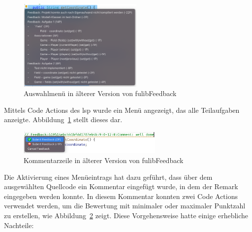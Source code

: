 \begin{figure}
    \centering
    \includegraphics[width=0.54\textwidth]{images/fulibFeedback-old-menu}
    \caption{Auswahlmenü in älterer Version von fulibFeedback}
    \label{fig:fulibFeedback-old-menu}
\end{figure}

Mittels Code Actions des \ac{lsp} wurde ein Menü angezeigt, das alle Teilaufgaben anzeigte.
Abbildung~\ref{fig:fulibFeedback-old-menu} stellt dieses dar.

\begin{figure}
    \centering
    \includegraphics[width=0.63\textwidth]{images/fulibFeedback-old-comment}
    \caption{Kommentarzeile in älterer Version von fulibFeedback}
    \label{fig:fulibFeedback-old-comment}
\end{figure}

Die Aktivierung eines Menüeintrags hat dazu geführt, dass über dem ausgewählten Quellcode ein Kommentar eingefügt wurde, in dem der Remark eingegeben werden konnte.
In diesem Kommentar konnten zwei Code Actions verwendet werden, um die Bewertung mit minimaler oder maximaler Punktzahl zu erstellen, wie Abbildung~\ref{fig:fulibFeedback-old-comment} zeigt.
Diese Vorgehensweise hatte einige erhebliche Nachteile:

